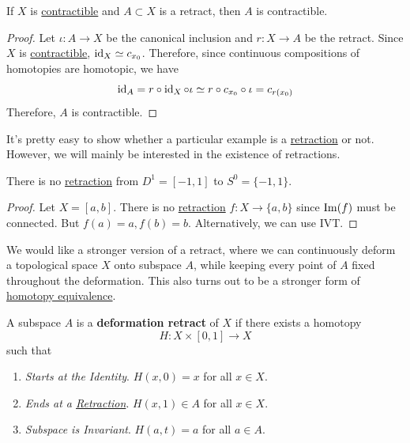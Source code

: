 	\begin{theorem}
	  \label{thm:retracts-of-contractible-spaces-are-contractible}
		If $X$ is \hyperref[def:contractible]{contractible} and $A \subset X$ is a retract, then $A$ is contractible. 
	\end{theorem}
	\begin{proof}
		Let $\iota: A \to X$ be the canonical inclusion and $r: X \to A$ be the retract. Since $X$ is \hyperref[def:contractible]{contractible}, $\operatorname{id}_X \simeq c_{x_0}$. Therefore, since continuous compositions of homotopies are homotopic, we have 
		\begin{equation}
			\operatorname{id}_A = r \circ \operatorname{id}_X \circ \iota \simeq r \circ c_{x_0} \circ \iota = c_{r(x_0)}
		\end{equation}
		Therefore, $A$ is contractible. 
	\end{proof}

  It's pretty easy to show whether a particular example is a \hyperref[def:retraction]{retraction} or not. However, we will mainly be interested in the existence of retractions. 

  \begin{theorem}
    \label{thm:unit-interval-to-endpoints}
    There is no \hyperref[def:retraction]{retraction} from $D^1 = [-1, 1]$ to $S^0 = \{-1, 1\}$. 
  \end{theorem}
  \begin{proof}
    Let $X = [a, b]$. There is no \hyperref[def:retraction]{retraction} $f: X \to \{a, b\}$ since $\operatorname{Im}(f)$ must be connected. But $f(a) = a, f(b) = b$. Alternatively, we can use IVT. 
  \end{proof}

	We would like a stronger version of a retract, where we can continuously deform a topological space $X$ onto subspace $A$, while keeping every point of $A$ fixed throughout the deformation. This also turns out to be a stronger form of \hyperref[def:homotopy-equivalence]{homotopy equivalence}. 

	\begin{definition}
	  \label{def:deformation-retract}
		A subspace $A$ is a \textbf{deformation retract} of $X$ if there exists a homotopy 
		\begin{equation}
			H: X \times [0, 1] \to X
		\end{equation}
		such that 
		\begin{enumerate}
		  \item \textit{Starts at the Identity}. $H(x, 0) = x$ for all $x \in X$. 
			\item \textit{Ends at a \hyperref[def:retraction]{Retraction}}. $H(x, 1) \in A$ for all $x \in X$. 
			\item \textit{Subspace is Invariant}. $H(a, t) = a$ for all $a \in A$. 
		\end{enumerate}
	\end{definition}

